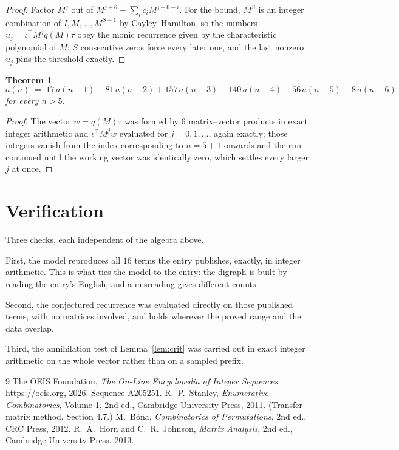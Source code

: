 \documentclass[11pt,a4paper]{article}
\theoremstyle{plain}
\newtheorem{theorem}{Theorem}
\theoremstyle{definition}
\begin{document}
\begin{proof}
Factor $M^{j}$ out of $M^{j+6}-\sum_ic_iM^{j+6-i}$. For the bound, $M^{S}$
is an integer combination of $I,M,\dots,M^{S-1}$ by Cayley--Hamilton, so the numbers
$u_j=\iota^{\!\top}M^{j}q(M)\tau$ obey the monic recurrence given by the characteristic
polynomial of $M$; $S$ consecutive zeros force every later one, and the last nonzero $u_j$
pins the threshold exactly.
\end{proof}

\begin{theorem}
\[
a(n)\;=\;17\,a(n-1) - 81\,a(n-2) + 157\,a(n-3) - 140\,a(n-4) + 56\,a(n-5) - 8\,a(n-6)
\]
for every $n>5$.
\end{theorem}

\begin{proof}
The vector $w=q(M)\tau$ was formed by $6$ matrix--vector products in exact integer
arithmetic and $\iota^{\!\top}M^{j}w$ evaluated for $j=0,1,\dots$, again exactly; those
integers vanish from the index corresponding to $n=5+1$ onwards and the run continued
until the working vector was identically zero, which settles every larger $j$ at once.
\end{proof}

\section{Verification}

Three checks, each independent of the algebra above.

First, the model reproduces all $16$ terms the entry publishes, exactly, in integer
arithmetic. This is what ties the model to the entry: the digraph is built by reading the
entry's English, and a misreading gives different counts.

Second, the conjectured recurrence was evaluated directly on those published terms, with no
matrices involved, and holds wherever the proved range and the data overlap.

Third, the annihilation test of Lemma~\ref{lem:crit} was carried out in exact integer
arithmetic on the whole vector rather than on a sampled prefix.

\begin{thebibliography}{9}
 The OEIS Foundation, \emph{The On-Line Encyclopedia of Integer
Sequences}, \url{https://oeis.org}, 2026. Sequence A205251.
 R.~P.~Stanley, \emph{Enumerative Combinatorics}, Volume 1, 2nd ed.,
Cambridge University Press, 2011. (Transfer-matrix method, Section 4.7.)
 M.~B\'ona, \emph{Combinatorics of Permutations}, 2nd ed., CRC
Press, 2012.
 R.~A.~Horn and C.~R.~Johnson, \emph{Matrix Analysis}, 2nd ed., Cambridge
University Press, 2013.
\end{thebibliography}
\end{document}
